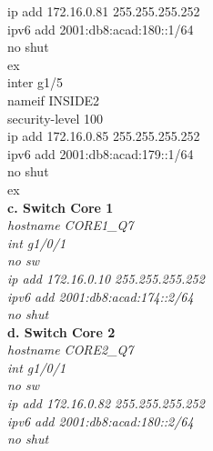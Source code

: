 \documentclass[a4paper, 12pt]{article}
\begin{document}
{\hspace*{2cm}ip add 172.16.0.81 255.255.255.252\\
\hspace*{2cm}ipv6 add 2001:db8:acad:180::1/64\\
\hspace*{2cm}no shut \\
\hspace*{2cm}ex\\
\hspace*{2cm}inter g1/5\\
\hspace*{2cm}nameif INSIDE2\\
\hspace*{2cm}security-level 100\\
\hspace*{2cm}ip add 172.16.0.85 255.255.255.252\\
\hspace*{2cm}ipv6 add 2001:db8:acad:179::1/64\\
\hspace*{2cm}no shut\\
\hspace*{2cm}ex\\}
\hspace*{1cm}\textbf{c. Switch Core 1}\\
\hspace*{2cm}\textit{hostname CORE1\_Q7\\
\hspace*{2cm}int g1/0/1\\
\hspace*{2cm}no sw\\
\hspace*{2cm}ip add 172.16.0.10 255.255.255.252\\
\hspace*{2cm}ipv6 add 2001:db8:acad:174::2/64\\
\hspace*{2cm}no shut\\}
\hspace*{1cm}\textbf{d. Switch Core 2}\\
\hspace*{2cm}\textit{hostname CORE2\_Q7\\
\hspace*{2cm}int g1/0/1\\
\hspace*{2cm}no sw\\
\hspace*{2cm}ip add 172.16.0.82 255.255.255.252\\
\hspace*{2cm}ipv6 add 2001:db8:acad:180::2/64\\
\hspace*{2cm}no shut\\}
\end{document}
